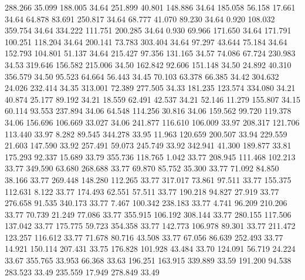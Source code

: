  288.266   35.099  188.005        34.64
 251.899   40.801  148.886        34.64
 185.058   56.158   17.661        34.64
  64.878   83.691  250.817        34.64
  68.777   41.070   89.230        34.64
   0.920  108.032  359.754        34.64
 334.222  111.751  200.285        34.64
   0.930   69.966  171.650        34.64
 171.791  100.251  118.204        34.64
 200.141   73.783  303.404        34.64
  97.297   43.644   75.184        34.64
 152.793  104.801   51.137        34.64
 215.427   97.356  131.165        34.57
  74.086   67.724  230.983        34.53
 319.646  156.582  215.006        34.50
 162.842   92.606  151.148        34.50
  24.892   40.310  356.579        34.50
  95.523   64.664   56.443        34.45
  70.103   63.378   66.385        34.42
 304.632   24.026  232.414        34.35
 313.001   72.389  277.505        34.33
 181.235  123.574  334.080        34.21
  40.874   25.177   89.192        34.21
  18.559   62.491   42.537        34.21
  52.146   11.279  155.807        34.15
  60.114   93.553  237.894        34.06
  64.548  114.256   30.816        34.06
 159.562   99.720  119.378        34.06
 156.696  106.669   33.027        34.06
 241.877  116.610  106.009        33.97
 208.317  121.706  113.440        33.97
   8.282   89.545  344.278        33.95
  11.963  120.659  200.507        33.94
 229.559   21.603  147.590        33.92
 257.491   59.073  245.749        33.92
 342.941   41.300  189.877        33.81
 175.293   92.337   15.689        33.79
 355.736  118.765    1.042        33.77
 208.945  111.468  102.213        33.77
 349.590   63.680  268.688        33.77
  69.870   85.752   35.300        33.77
  71.092   84.850   38.166        33.77
 269.448  148.280  112.265        33.77
 317.017   73.861   97.511        33.77
 155.375  112.631    8.122        33.77
 174.493   62.551   57.511        33.77
 190.218   94.827   27.919        33.77
 276.658   91.535  340.173        33.77
   7.467  100.342  238.183        33.77
   4.741   96.209  210.206        33.77
  70.739   21.249   77.086        33.77
 355.915  106.192  308.144        33.77
 280.155  117.506  137.042        33.77
 175.775   59.723  354.358        33.77
 142.773  106.978   89.301        33.77
 211.472  123.257  116.612        33.77
  71.678   80.716   43.508        33.77
  67.056   86.639  252.493        33.77
  14.921  150.114  207.431        33.75
 176.828  101.928   43.484        33.70
 124.091   56.719   24.224        33.67
 355.765   33.953   66.368        33.63
 196.251  163.915  339.889        33.59
 191.200   94.538  283.523        33.49
 235.559   17.949  278.849        33.49
